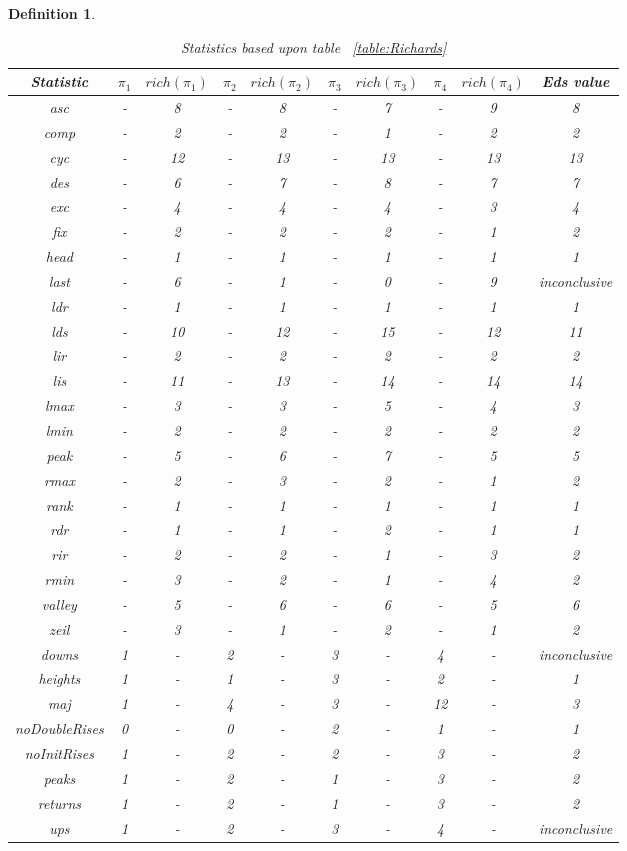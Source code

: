 \documentclass[12pt]{article}
\newtheorem{definition}{Definition}
\begin{document}
\begin{definition}
\begin{table}[H]
\caption{Statistics based upon table ~\ref{table:Richards}}
\centering
\tabcolsep=0.11cm
\begin{tabular}{c | c c c c c c c c | c}
\hline\hline
Statistic & $\pi_1$ & $rich(\pi_1)$ & $\pi_2$ & $rich(\pi_2)$ & $\pi_3$ & $rich(\pi_3)$ & $\pi_4$ & $rich(\pi_4)$ & Eds value\\ [0.5ex]
\hline
asc & - & 8 & - & 8 & - & 7 & - & 9 & 8\\
comp & - & 2 & - & 2 & - & 1 & - & 2 & 2\\
cyc & - & 12 & - & 13 & - & 13 & - & 13 & 13\\
des & - &  6 & - & 7 & - & 8 & - & 7 & 7\\
exc & - &  4 & - & 4 & - & 4 & - & 3 & 4\\
fix & - &  2 & - & 2 & - & 2 & - & 1 & 2\\
head & - &  1 & - & 1 & - & 1 & - & 1 & 1\\
last & - & 6 & - & 1 & - & 0 & - & 9 & inconclusive\\
ldr & - &  1 & - & 1 & - & 1 & - & 1 & 1\\
lds & - &  10 & - & 12 & - & 15 & - & 12 & 11\\ 
lir & - &  2 & - & 2 & - & 2 & - & 2 & 2\\
lis & - &  11 & - & 13 & - & 14 & - & 14 & 14\\ 
lmax & - &  3 & - & 3 & - & 5 & - & 4 & 3\\
lmin & - &  2 & - & 2 & - & 2 & - & 2 & 2\\
peak & - &  5 & - & 6 & - & 7 & - & 5 & 5\\
rmax & - &  2 & - & 3 & - & 2 & - & 1 & 2\\
rank & - &  1 & - & 1 & - & 1 & - & 1 & 1\\
rdr & - & 1 & - & 1 & - & 2 & - & 1 & 1\\
rir & - & 2 & - & 2 & - & 1 & - & 3 & 2\\
rmin & - & 3 & - & 2 & - & 1 & - & 4 & 2\\
valley & - & 5 & - & 6 & - & 6 & - & 5 & 6\\  
zeil & - & 3 & - & 1 & - & 2 & - & 1 & 2\\
\hline
downs & 1 & - & 2 & - & 3 & - & 4 & - & inconclusive\\
heights & 1 & - & 1 & - & 3 & - & 2 & - & 1\\  
maj & 1 & - & 4 & - & 3 & - & 12 & - & 3\\ 
noDoubleRises & 0 & - & 0 & - & 2 & - & 1 & - & 1\\
noInitRises & 1 & - & 2 & - & 2 & - & 3 & - & 2\\
peaks & 1 & - & 2 & - & 1 & - & 3 & - & 2\\
returns & 1 & - & 2 & - & 1 & - & 3 & - & 2\\ 
ups & 1 & - & 2 & - & 3 & - & 4 & - & inconclusive\\
\hline
\end{tabular}
\label{table:Richards1}
\end{table}


\end{definition}
\end{document}
